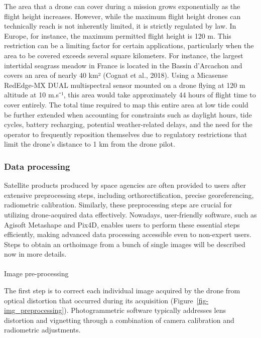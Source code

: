 \documentclass[
  letterpaper,
  11pt,
  english,
  singlespacing,
  headsepline]{MastersDoctoralThesis}
\makeatletter
\let\oldparagraph\paragraph
\renewcommand{\paragraph}{
    \@ifstar
      \xxxParagraphStar
      \xxxParagraphNoStar
  }
\newcommand{\xxxParagraphStar}[1]{\oldparagraph*{#1}\mbox{}}
\newcommand{\xxxParagraphNoStar}[1]{\oldparagraph{#1}\mbox{}}
\makeatother
\begin{document}
\begin{spacing}{1.5}
The area that a drone can cover during a mission grows exponentially as
the flight height increases. However, while the maximum flight height
drones can technically reach is not inherently limited, it is strictly
regulated by law. In Europe, for instance, the maximum permitted flight
height is 120 m. This restriction can be a limiting factor for certain
applications, particularly when the area to be covered exceeds several
square kilometers. For instance, the largest intertidal seagrass meadow
in France is located in the Bassin d'Arcachon and covers an area of
nearly 40 km² (Cognat et al., 2018). Using a Micasense RedEdge-MX DUAL
multispectral sensor mounted on a drone flying at 120 m altitude at 10
m.s⁻¹, this area would take approximately 44 hours of flight time to
cover entirely. The total time required to map this entire area at low
tide could be further extended when accounting for constraints such as
daylight hours, tide cycles, battery recharging, potential
weather-related delays, and the need for the operator to frequently
reposition themselves due to regulatory restrictions that limit the
drone's distance to 1 km from the drone pilot.

\subsubsection{Data processing}\label{data-processing}

Satellite products produced by space agencies are often provided to
users after extensive preprocessing steps, including orthorectification,
precise georeferencing, radiometric calibration. Similarly, these
preprocessing steps are crucial for utilizing drone-acquired data
effectively. Nowadays, user-friendly software, such as Agisoft Metashape
and Pix4D, enables users to perform these essential steps efficiently,
making advanced data processing accessible even to non-expert users.
Steps to obtain an orthoimage from a bunch of single images will be
described now in more details.

\paragraph{Image pre-processing}\label{image-pre-processing}

The first step is to correct each individual image acquired by the drone
from optical distortion that occurred during its acquisition
(Figure~\ref{fig-img_preprocessing}). Photogrammetric software typically
addresses lens distortion and vignetting through a combination of camera
calibration and radiometric adjustments.


\end{spacing}
\end{document}

